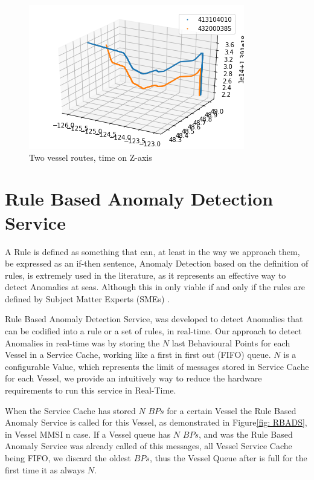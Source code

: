 \begin{figure}[H]
	\centering
	\includegraphics[scale = .9]{figures/VesselRendevouz3d}
    \caption{Two vessel routes, time on Z-axis}
    \label{fig: VesselRendevouz3d}
\end{figure}


\section{Rule Based Anomaly Detection Service}
A Rule is defined as something that can, at least in the way we approach them, be expressed as an if-then sentence, \cite{Edlund2006titleRule-basedSurveillance/title}
Anomaly Detection based on the definition of rules, is extremely used in the literature, as it represents an effective way to detect Anomalies at seas. Although this in only viable if and only if the rules are defined by Subject Matter Experts (SMEs) \cite{Boinepalli2014AAlgorithm, Will2011FastProcesses}.

Rule Based Anomaly Detection Service, was developed to detect Anomalies that can be codified into a rule or a set of rules, in real-time. 
Our approach to detect Anomalies in real-time was by storing the $N$ last Behavioural Points for each Vessel in a Service Cache, working like a first in first out (FIFO) queue. $N$ is a configurable Value, which represents the limit of messages stored in Service Cache for each Vessel, we provide an intuitively way to reduce the hardware requirements to run this service in Real-Time.

When the Service Cache has stored $N$ $BPs$ for a certain Vessel the Rule Based Anomaly Service is called for this Vessel, as demonstrated in Figure\ref{fig: RBADS}, in Vessel MMSI n case.
If a Vessel queue has $N$ $BPs$, and was the Rule Based Anomaly Service was already called of this messages, all Vessel Service Cache being FIFO, we discard the oldest $BPs$, thus the Vessel Queue after is full for the first time it as always $N$.

